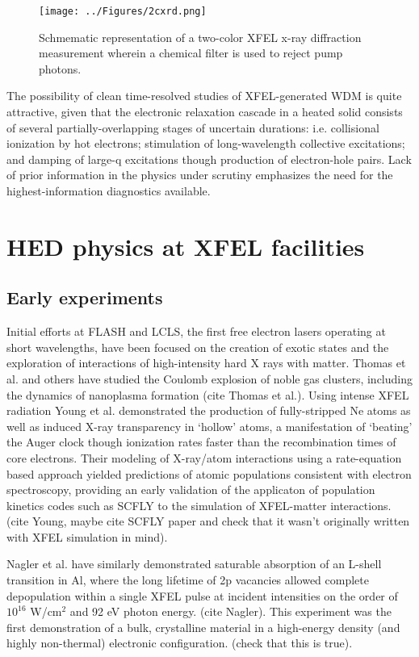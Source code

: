 \documentclass [11pt, proquest, article] {uwthesis}[2016/11/22]
\begin{document}
\begin{figure}[h] 
\caption{Schmematic representation of a two-color XFEL x-ray diffraction measurement wherein a chemical filter is used to reject pump photons.}
\centering
\texttt{[image: ../Figures/2cxrd.png]}
\label{2cxrd}
\end{figure}


The possibility of clean time-resolved studies of XFEL-generated WDM is quite attractive, given that the electronic relaxation cascade in a heated solid consists of several partially-overlapping stages of uncertain durations: i.e. collisional ionization by hot electrons; stimulation of long-wavelength collective excitations; and damping of large-q excitations though production of electron-hole pairs. Lack of prior information in the physics under scrutiny emphasizes the need for the highest-information diagnostics available.

\section{HED physics at XFEL facilities}
\subsection{Early experiments}
Initial efforts at FLASH and LCLS, the first free electron lasers operating at short wavelengths, have been focused on the creation of exotic states and the exploration of interactions of high-intensity hard X rays with matter. Thomas et al. and others have studied the Coulomb explosion of noble gas clusters, including the dynamics of nanoplasma formation (cite Thomas et al.). Using intense XFEL radiation Young et al. demonstrated the production of fully-stripped Ne atoms as well as induced X-ray transparency in `hollow' atoms, a manifestation of `beating' the Auger clock though ionization rates faster than the recombination times of core electrons. Their modeling of X-ray/atom interactions using a rate-equation based approach yielded predictions of atomic populations consistent with electron spectroscopy, providing an early validation of the applicaton of population kinetics codes such as SCFLY to the simulation of XFEL-matter interactions. (cite Young, maybe cite SCFLY paper and check that it wasn't originally written with XFEL simulation in mind).


Nagler et al. have similarly demonstrated saturable absorption of an L-shell transition in Al, where the long lifetime of 2p vacancies allowed complete depopulation within a single XFEL pulse at incident intensities on the order of $10^{16}$ W/cm$^2$ and 92 eV photon energy. (cite Nagler). This experiment was the first demonstration of a bulk, crystalline material in a high-energy density (and highly non-thermal) electronic configuration. (check that this is true). 
\end{document}
